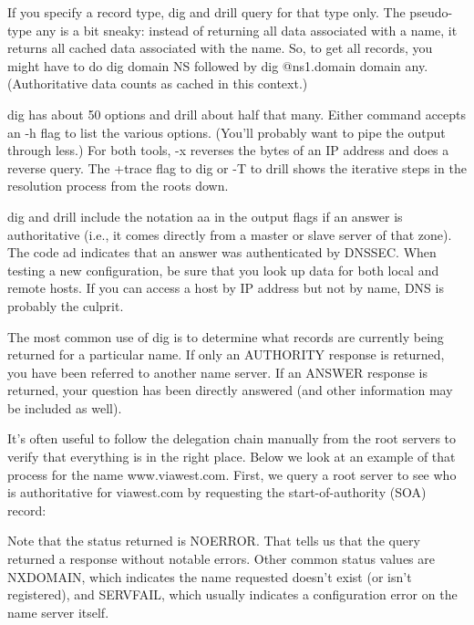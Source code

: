 If you specify a record type, {dig} and {drill} query for that type
only. The pseudo-type {any} is a bit sneaky: instead of returning all
data associated with a name, it returns all {cached} data associated
with the name. So, to get all records, you might have to do {dig}
{domain} {NS} followed by {dig @ns1.}{domain}{ }{domain}{ any}.
(Authoritative data counts as cached in this context.)

{dig} has about 50 options and {drill} about half that many. Either
command accepts an {-h} flag to list the various options. (You'll
probably want to pipe the output through {less}.) For both tools, {-x}
reverses the bytes of an IP address and does a reverse query. The
{+trace} flag to {dig} or {-T} to {drill} shows the iterative steps in
the resolution process from the roots down.

{dig} and {drill} include the notation {aa} in the output flags if an
answer is authoritative (i.e., it comes directly from a master or slave
server of that zone). The code {ad} indicates that an answer was
authenticated by DNSSEC. When testing a new configuration, be sure that
you look up data for both local and remote hosts. If you can access a
host by IP address but not by name, DNS is probably the culprit.

The most common use of {dig} is to determine what records are currently
being returned for a particular name. If only an {AUTHORITY} response is
returned, you have been referred to another name server. If an {ANSWER}
response is returned, your question has been directly answered (and
other information may be included as well).

It's often useful to follow the delegation chain manually from the root
servers to verify that everything is in the right place. Below we look
at an example of that process for the name www.viawest.com. First, we
query a root server to see who is authoritative for viawest.com by
requesting the start-of-authority (SOA) record:


Note that the status returned is
\protect\hypertarget{part0024_split_018.htmlux5cux23_idIndexMarker2055}{}{}{NOERROR}.
That tells us that the query returned a response without notable errors.
Other common status values are
\protect\hypertarget{part0024_split_018.htmlux5cux23_idIndexMarker2056}{}{}{NXDOMAIN},
which indicates the name requested doesn't exist (or isn't registered),
and
\protect\hypertarget{part0024_split_018.htmlux5cux23_idIndexMarker2057}{}{}{SERVFAIL},
which usually indicates a configuration error on the name server itself.


